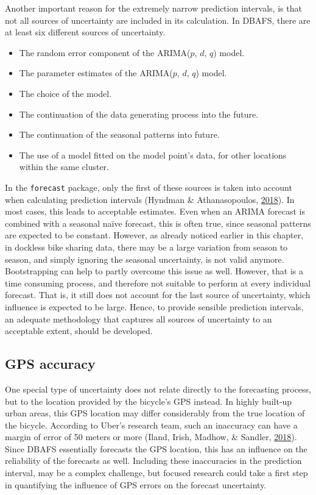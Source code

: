 \documentclass[12pt,oneside]{reedthesis}
\providecommand{\tightlist}{%
  \setlength{\itemsep}{0pt}\setlength{\parskip}{0pt}}
\begin{document}
Another important reason for the extremely narrow prediction intervals,
is that not all sources of uncertainty are included in its calculation.
In DBAFS, there are at least six different sources of uncertainty.
\begin{itemize}
\tightlist
\item
  The random error component of the ARIMA(\(p\), \(d\), \(q\)) model.
\item
  The parameter estimates of the ARIMA(\(p\), \(d\), \(q\)) model.
\item
  The choice of the model.
\item
  The continuation of the data generating process into the future.
\item
  The continuation of the seasonal patterns into future.
\item
  The use of a model fitted on the model point's data, for other
  locations within the same cluster.
\end{itemize}
In the \texttt{forecast} package, only the first of these sources is
taken into account when calculating prediction intervals (Hyndman \&
Athanasopoulos, \protect\hyperlink{ref-hyndman2018fpp}{2018}). In most
cases, this leads to acceptable estimates. Even when an ARIMA forecast
is combined with a seasonal naïve forecast, this is often true, since
seasonal patterns are expected to be constant. However, as already
noticed earlier in this chapter, in dockless bike sharing data, there
may be a large variation from season to season, and simply ignoring the
seasonal uncertainty, is not valid anymore. Bootstrapping can help to
partly overcome this issue as well. However, that is a time consuming
process, and therefore not suitable to perform at every individual
forecast. That is, it still does not account for the last source of
uncertainty, which influence is expected to be large. Hence, to provide
sensible prediction intervals, an adequate methodology that captures all
sources of uncertainty to an acceptable extent, should be developed.

\subsection{GPS accuracy}\label{gps-accuracy}

One special type of uncertainty does not relate directly to the
forecasting process, but to the location provided by the bicycle's GPS
instead. In highly built-up urban areas, this GPS location may differ
considerably from the true location of the bicycle. According to Uber's
research team, such an inaccuracy can have a margin of error of 50
meters or more (Iland, Irish, Madhow, \& Sandler,
\protect\hyperlink{ref-ubereng}{2018}). Since DBAFS essentially
forecasts the GPS location, this has an influence on the reliability of
the forecasts as well. Including these inaccuracies in the prediction
interval, may be a complex challenge, but focused research could take a
first step in quantifying the influence of GPS errors on the forecast
uncertainty.
\end{document}
